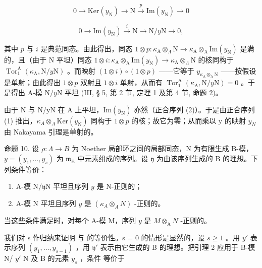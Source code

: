 \[
0 \to \mathrm{Ker} (y _ {\mathrm{N}}) \longrightarrow \mathrm{N} \stackrel {p} {\longrightarrow} \mathrm{Im} (y _ {\mathrm{N}}) \to 0\tag{1}
\]

\[
0 \to \mathrm{Im} (y _ {\mathrm{N}}) \stackrel {i} {\longrightarrow} \mathrm{N} \longrightarrow \mathrm{N} / y \mathrm{N} \to 0,\tag{2}
\]

其中 \(p\) 与 \(i\) 是典范同态。由此得出，同态 \(1 \otimes p : \kappa_{\mathrm{A}} \otimes_{\Lambda} \mathrm{N} \longrightarrow \kappa_{\mathrm{A}} \otimes_{\mathrm{A}} \mathrm{Im}(y_{\mathrm{N}})\) 是满的，且（由于 N 平坦）同态 \(1 \otimes i : \kappa_{\mathrm{A}} \otimes_{\mathrm{A}} \mathrm{Im}(y_{\mathrm{N}}) \longrightarrow \kappa_{\mathrm{A}} \otimes_{\Lambda} \mathrm{N}\) 的核同构于 \(\operatorname{Tor}_1^{\mathrm{A}}(\kappa_{\mathrm{A}}, \mathrm{N}/y\mathrm{N})\) 。而映射 \((1 \otimes i) \circ (1 \otimes p)\) ——它等于 \(y_{\kappa_{\mathrm{A}} \otimes_{\mathrm{A}} \mathrm{N}}\) ——按假设是单射；由此得出 \(1 \otimes p\) 双射且 \(1 \otimes i\) 单射，从而有 \(\operatorname{Tor}_1^{\mathrm{A}}(\kappa_{\mathrm{A}}, \mathrm{N}/y\mathrm{N}) = 0\) 。于是得出 A-模 \(\mathrm{N}/y\mathrm{N}\) 平坦 (III, § 5, 第 2 节, 定理 1 及第 4 节, 命题 2)。

由于 N 与 N/yN 在 A 上平坦，\(\mathrm{Im}(y_{\mathrm{N}})\) 亦然（正合序列 (2)）。于是由正合序列 (1) 推出，\(\kappa_{A} \otimes_{A} \mathrm{Ker}(y_{\mathrm{N}})\) 同构于 \(1 \otimes p\) 的核；故它为零；从而乘以 y 的映射 \(y_{N}\) 由 Nakayama 引理是单射的。

命题 10. 设 \(\rho: \Lambda \to B\) 为 Noether 局部环之间的局部同态，N 为有限生成 B-模，\(y = (y_1, \ldots, y_s)\) 为 \(\mathfrak{m}_{\mathrm{B}}\) 中元素组成的序列。设 \(\mathfrak{y}\) 为由该序列生成的 B 的理想。下列条件等价：

\begin{enumerate}
\def\labelenumi{(\roman{enumi})}
\item
  A-模 N/\(\mathfrak{y}\)N 平坦且序列 \(y\) 是 N-正则的；
\item
  A-模 N 平坦且序列 \(y\) 是 \((\kappa_{A} \otimes_{A} N)\) -正则的。
\end{enumerate}

当这些条件满足时，对每个 A-模 M，序列 \(y\) 是 \(M\otimes_{\mathrm{A}}N\) -正则的。

我们对 s 作归纳来证明 与 的等价性。s = 0 的情形是显然的，设 \(s \geqslant 1\) 。用 \(y'\) 表示序列 \((y_{1}, \ldots, y_{s-1})\) ，用 \(\mathfrak{y}'\) 表示由它生成的 B 的理想。把引理 2 应用于 B-模 N/ \(y'\) N 及 B 的元素 \(y_{s}\) ，条件 等价于


